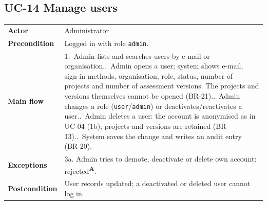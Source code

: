 \documentclass[11pt,a4paper]{article}
\newcommand{\assume}{\textsuperscript{\textcolor{orange!80!black}{\textbf{A}}}}
\begin{document}
\noindent\begin{minipage}{\linewidth}
\subsection*{UC-14 Manage users}
\begin{tabularx}{\linewidth}{@{}>{\raggedright\leavevmode\bfseries\color{creBlue}}p{2.6cm} Y@{}}
\toprule
Actor & Administrator \\
Precondition & Logged in with role \texttt{admin}. \\
Main flow & 1.~Admin lists and searches users by e-mail or organisation..~Admin opens a user; system shows e-mail, sign-in methods, organisation, role, status, number of projects and number of assessment versions. The projects and versions themselves cannot be opened (BR-21)..~Admin changes a role (\texttt{user}/\texttt{admin}) or deactivates/reactivates a user..~Admin deletes a user: the account is anonymised as in UC-04 (1b); projects and versions are retained (BR-13)..~System saves the change and writes an audit entry (BR-20). \\
Exceptions & 3a. Admin tries to demote, deactivate or delete own account: rejected\assume{}. \\
Postcondition & User records updated; a deactivated or deleted user cannot log in. \\
\bottomrule
\end{tabularx}
\end{minipage}
\par\medskip
\end{document}
